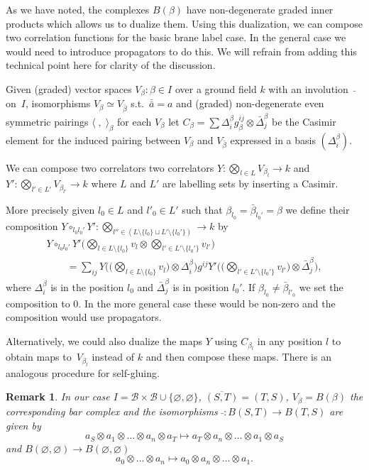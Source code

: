 \documentclass[pdftex]{sigma}
\newtheorem{rmk}[thm]{Remark}
\def\calB{{\mathcal B}}
\def\la{\langle}
\def\ra{\rangle}
\newcommand{\aoa}[2]{a_{#1}\otimes \dots \otimes a_{#2}}
\begin{document}
As we have noted, the complexes $B(\beta)$ have non-degenerate
graded inner products which allows us to dualize them.
 Using this
dualization, we can compose two correlation functions for the basic
brane label case. In the general case we would need to introduce
propagators to do this. We will refrain from adding this technical
point here for clarity of the discussion.

Given  (graded) vector spaces $V_{\beta}: \beta\in I$ over a ground
f\/ield $k$ with an involution~$\bar{}$ on~$I$, isomorphisms
$V_{\beta}\simeq V_{\bar\beta}$ s.t.\ $\bar{\bar{a}}=a$ and (graded)
non-degenerate even symmetric pairings $\la\;,\;\ra_{\beta}$ for
each $V_{\beta}$
 let $C_{\beta}=\sum
\Delta^{\beta}_i g^{ij}_{\beta} \otimes \bar\Delta^{\beta}_j$ be the
Casimir element for the induced pairing between $V_{\beta}$ and
$V_{\bar\beta}$ expressed in a basis $(\Delta^{\beta}_i)$.


We can compose two correlators two correlators $Y:\bigotimes_{l \in
L} V_{\beta_l} \to k$ and $Y':\bigotimes_{l'\in L'}
V_{\beta_{l'}}\to k $ where $L$ and $L'$ are labelling sets by
inserting a Casimir.

More precisely given $l_0\in L$ and $l'_0\in L'$ such that
$\beta_{l_0}=\bar\beta_{l_0'}=\beta$ we def\/ine their composition
$Y\circ_{l_0l_0'} Y': \bigotimes_{l''\in (L \setminus \{l_0\} \sqcup
L' \setminus \{l_0'\})} \to k$ by
\begin{gather*}
Y\circ_{l_0l_0'} Y' \Big(\bigotimes_{l\in L\setminus \{l_0\}} v_l\otimes
\bigotimes_{l'\in L'\setminus \{l_0'\}} v_{l'}\Big) \\
\qquad{}
=\sum_{ij}
Y\bigg(\Big(\bigotimes_{l\in L\setminus \{l_0\}} v_l\Big)\otimes
\Delta^{\beta}_i\bigg)g^{ij}Y'\bigg(\Big(\bigotimes_{l'\in L'\setminus
\{l_0'\}} v_{l'}\Big)\otimes \bar \Delta^{\beta}_j\bigg),
\end{gather*}
where $\Delta^{\beta}_i$ is in the position $l_0$ and $\bar
\Delta^{\beta}_j$ is in position $l_0'$. If $\beta_{l_0}\neq
\bar\beta_{l'_0}$ we set the composition to $0$. In the more general
case these would be non-zero and the composition would use
propagators.


Alternatively, we could also dualize the maps $Y$ using
$C_{\beta_l}$ in any position $l$ to obtain maps to~$V_{\beta_l}$
instead of $k$ and then compose these maps. There is an analogous
procedure for self-gluing.

\begin{rmk}
In our case $I=\calB\times \calB\cup \{\varnothing,\varnothing\}$,
$\overline{(S,T)}=(T,S)$, $V_{\beta}=B(\beta)$ the corresponding bar
complex and the isomorphisms $\bar{}:B(S,T)\to B(T,S)$  are given by
\begin{equation*}
a_S\otimes \aoa{1}{n}\otimes a_T\mapsto a_T \otimes
\aoa{n}{1}\otimes a_S
\end{equation*}
and $B(\varnothing,\varnothing)\to B(\varnothing,\varnothing)$
\begin{equation*}
 \aoa{0}{n} \mapsto a_0 \otimes
\aoa{n}{1}.
\end{equation*}
\end{rmk}
\end{document}
